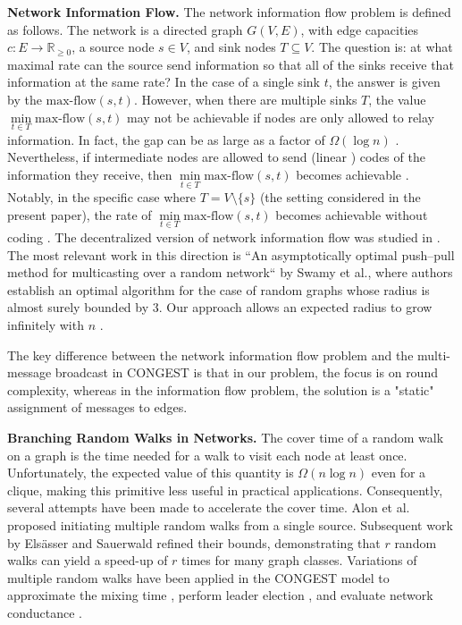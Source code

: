     
    \textbf{Network Information Flow.} The network information flow problem \cite{ahlswede2000network} is defined as follows. The network is a directed graph $G(V, E)$, with edge capacities $c: E \rightarrow \mathbb{R}_{\geq 0}$, a source node $s \in V$, and sink nodes $T \subseteq V$. The question is: at what maximal rate can the source send information so that all of the sinks receive that information at the same rate? In the case of a single sink $t$, the answer is given by the $\text{max-flow}(s, t)$. However, when there are multiple sinks $T$, the value $\min\limits_{t \in T} \text{max-flow}(s, t)$ may not be achievable if nodes are only allowed to relay information. In fact, the gap can be as large as a factor of $\Omega(\log n)$ \cite{jaggi2005polynomial}. Nevertheless, if intermediate nodes are allowed to send (linear \cite{li2003linear}) codes of the information they receive, then $\min\limits_{t \in T} \text{max-flow}(s, t)$ becomes achievable \cite{ahlswede2000network}. Notably, in the specific case where $T = V \setminus \{s\}$ (the setting considered in the present paper), the rate of $\min\limits_{t \in T} \text{max-flow}(s, t)$ becomes achievable without coding \cite{wu2004comparison}. The decentralized version of network information flow was studied in \cite{ho2003benefits, fragouli2004decentralized, ho2011universal}. The most relevant work in this direction is ``An asymptotically optimal push–pull method for multicasting over a random network`` \cite{swamy2013asymptotically} by Swamy et al., where authors establish an optimal algorithm for the case of random graphs whose radius is almost surely bounded by $3$. Our approach allows an expected radius to grow infinitely with $n$ \cite{chung2001diameter}.

    The key difference between the network information flow problem and the multi-message broadcast in CONGEST is that in our problem, the focus is on round complexity, whereas in the information flow problem, the solution is a "static" assignment of messages to edges.



    \textbf{Branching Random Walks in Networks.}
    The cover time of a random walk \cite{lawler2010random} on a graph is the time needed for a walk to visit each node at least once. Unfortunately, the expected value of this quantity is $\Omega(n\log n)$ even for a clique, making this primitive less useful in practical applications. Consequently, several attempts have been made to accelerate the cover time. Alon et al. \cite{alon2008many} proposed initiating multiple random walks from a single source. Subsequent work by Els\"asser and Sauerwald refined their bounds, demonstrating that $r$ random walks can yield a speed-up of $r$ times for many graph classes. Variations of multiple random walks have been applied in the CONGEST model to approximate the mixing time \cite{molla2017distributed}, perform leader election \cite{kutten2015sublinear, gilbert2018leader}, and evaluate network conductance \cite{fichtenberger2018two, batu2024all}.

